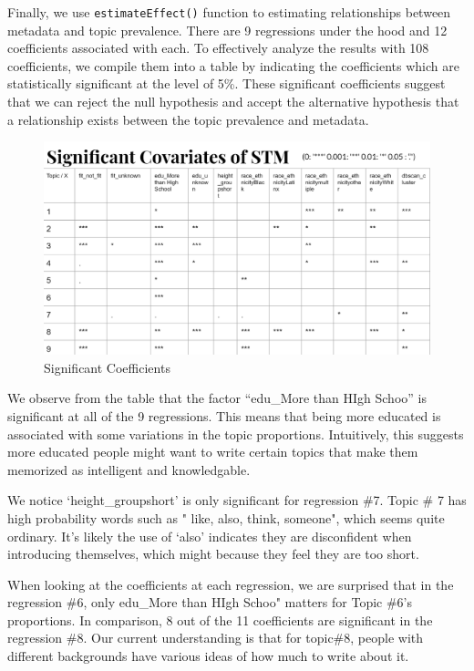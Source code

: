 \documentclass[]{article}
\begin{document}
Finally, we use \texttt{estimateEffect()} function to estimating
relationships between metadata and topic prevalence. There are 9
regressions under the hood and 12 coefficients associated with each. To
effectively analyze the results with 108 coefficients, we compile them
into a table by indicating the coefficients which are statistically
significant at the level of 5\%. These significant coefficients suggest
that we can reject the null hypothesis and accept the alternative
hypothesis that a relationship exists between the topic prevalence and
metadata.

\begin{figure}
\centering
\includegraphics{Plots/Covariates.png}
\caption{Significant Coefficients}
\end{figure}

We observe from the table that the factor ``edu\_More than HIgh Schoo''
is significant at all of the 9 regressions. This means that being more
educated is associated with some variations in the topic proportions.
Intuitively, this suggests more educated people might want to write
certain topics that make them memorized as intelligent and knowledgable.

We notice `height\_groupshort' is only significant for regression \#7.
Topic \# 7 has high probability words such as " like, also, think,
someone", which seems quite ordinary. It's likely the use of `also'
indicates they are disconfident when introducing themselves, which might
because they feel they are too short.

When looking at the coefficients at each regression, we are surprised
that in the regression \#6, only edu\_More than HIgh Schoo" matters for
Topic \#6's proportions. In comparison, 8 out of the 11 coefficients are
significant in the regression \#8. Our current understanding is that for
topic\#8, people with different backgrounds have various ideas of how
much to write about it.
\end{document}
